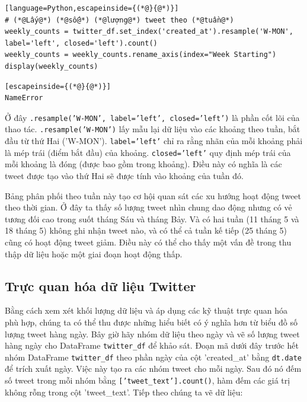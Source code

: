 \begin{lstlisting}[language=Python,escapeinside={(*@}{@*)}]
# (*@Lấy@*) (*@số@*) (*@lượng@*) tweet theo (*@tuần@*)
weekly_counts = twitter_df.set_index('created_at').resample('W-MON', label='left', closed='left').count()
weekly_counts = weekly_counts.rename_axis(index="Week Starting")
display(weekly_counts)
\end{lstlisting}

\begin{lstlisting}[escapeinside={(*@}{@*)}]
NameError
\end{lstlisting}

Ở đây \texttt{.resample('W-MON', label='left', closed='left')} là phần cốt lõi của thao tác. \texttt{.resample('W-MON')} lấy mẫu lại dữ liệu vào các khoảng theo tuần, bắt đầu từ thứ Hai ('W-MON'). \texttt{label='left'} chỉ ra rằng nhãn của mỗi khoảng phải là mép trái (điểm bắt đầu) của khoảng. \texttt{closed='left'} quy định mép trái của mỗi khoảng là đóng (được bao gồm trong khoảng). Điều này có nghĩa là các tweet được tạo vào thứ Hai sẽ được tính vào khoảng của tuần đó.

Bảng phân phối theo tuần này tạo cơ hội quan sát các xu hướng hoạt động tweet theo thời gian. Ở đây ta thấy số lượng tweet nhìn chung dao động nhưng có vẻ tương đối cao trong suốt tháng Sáu và tháng Bảy. Và có hai tuần (11 tháng 5 và 18 tháng 5) không ghi nhận tweet nào, và có thể cả tuần kế tiếp (25 tháng 5) cũng có hoạt động tweet giảm. Điều này có thể cho thấy một vấn đề trong thu thập dữ liệu hoặc một giai đoạn hoạt động thấp.

\subsection{Trực quan hóa dữ liệu Twitter}

Bằng cách xem xét khối lượng dữ liệu và áp dụng các kỹ thuật trực quan hóa phù hợp, chúng ta có thể thu được những hiểu biết có ý nghĩa hơn từ biểu đồ số lượng tweet hàng ngày. Bây giờ hãy nhóm dữ liệu theo ngày và vẽ số lượng tweet hàng ngày cho DataFrame \texttt{twitter\_df} để khảo sát. Đoạn mã dưới đây trước hết nhóm DataFrame \texttt{twitter\_df} theo phần ngày của cột 'created\_at' bằng \texttt{dt.date} để trích xuất ngày. Việc này tạo ra các nhóm tweet cho mỗi ngày. Sau đó nó đếm số tweet trong mỗi nhóm bằng \texttt{['tweet\_text'].count()}, hàm đếm các giá trị không rỗng trong cột 'tweet\_text'. Tiếp theo chúng ta vẽ dữ liệu:

